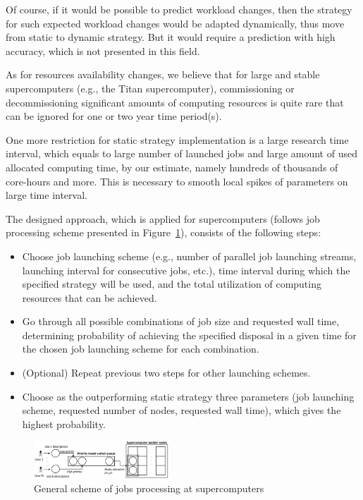 Of course, if it would be possible to predict workload changes, then the
strategy for such expected workload changes would be adapted dynamically,
thus move from static to dynamic strategy.
But it would require a prediction with high accuracy, which is not presented
in this field.

As for resources availability changes, we believe that for large and stable
supercomputers (e.g., the Titan supercomputer), commissioning or
decommissioning significant amounts of computing resources is quite rare
that can be ignored for one or two year time period(s).

One more restriction for static strategy implementation is a large research
time interval, which equals to large number of launched jobs and large
amount of used allocated computing time, by our estimate, namely hundreds of
thousands of core-hours and more.
This is necessary to smooth local spikes of parameters on large time interval.

The designed approach, which is applied for supercomputers (follows job
processing scheme presented in Figure~\ref{fig-job-processing-general-scheme}),
consists of the following steps:
\begin{itemize}
    \item Choose job launching scheme (e.g., number of parallel job launching
    streams, launching interval for consecutive jobs, etc.), time interval
    during which the specified strategy will be used, and the total utilization
    of computing resources that can be achieved.
    \item Go through all possible combinations of job size and requested
    wall time, determining probability of achieving the specified disposal in
    a given time for the chosen job launching scheme for each combination.
    \item (Optional) Repeat previous two steps for other launching schemes.
    \item Choose as the outperforming static strategy three parameters (job
    launching scheme, requested number of nodes, requested wall time), which
    gives the highest probability.
\end{itemize}

\begin{figure}
    \centering
    \includegraphics[width=0.45\textwidth]{pics/job-processing-general-scheme.png}
    \caption{General scheme of jobs processing at supercomputers}
    \label{fig-job-processing-general-scheme} 
\end{figure}

